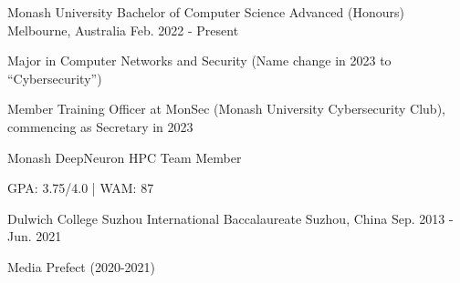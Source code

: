 

\begin{cventries}


    \cventry
    {Monash University}
    {Bachelor of Computer Science Advanced (Honours)}
    {Melbourne, Australia}
    {Feb. 2022 - Present}
    {
        \begin{cvitems}
            \item {Major in Computer Networks and Security (Name change in 2023 to “Cybersecurity”)}
            \item {Member Training Officer at MonSec (Monash University Cybersecurity Club), commencing as Secretary in 2023}
            \item {Monash DeepNeuron HPC Team Member}
            \item {GPA: 3.75/4.0 | WAM: 87}
        \end{cvitems}
    }


  \cventry
    {Dulwich College Suzhou} %
    {International Baccalaureate} %
    {Suzhou, China} %
    {Sep. 2013 - Jun. 2021} %
    {
      \begin{cvitems} %
        \item {Media Prefect (2020-2021)}
      \end{cvitems}
    }

\end{cventries}
\vspace{-3.0mm}